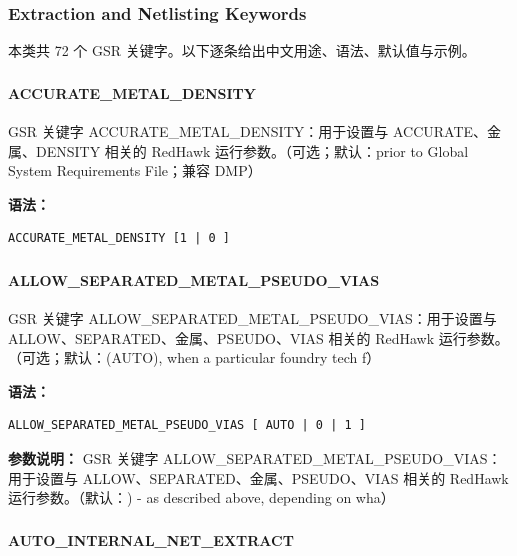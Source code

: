 \subsubsection*{Extraction and Netlisting Keywords}

本类共 72 个 GSR 关键字。以下逐条给出中文用途、语法、默认值与示例。

\subsubsection{}
\paragraph*{ACCURATE_METAL_DENSITY}

GSR 关键字 ACCURATE_METAL_DENSITY：用于设置与 ACCURATE、金属、DENSITY 相关的 RedHawk 运行参数。（可选；默认：prior to Global System Requirements File；兼容 DMP）

\textbf{语法：}
\begin{lstlisting}
ACCURATE_METAL_DENSITY [1 | 0 ]
\end{lstlisting}

\subsubsection{}
\paragraph*{ALLOW_SEPARATED_METAL_PSEUDO_VIAS}

GSR 关键字 ALLOW_SEPARATED_METAL_PSEUDO_VIAS：用于设置与 ALLOW、SEPARATED、金属、PSEUDO、VIAS 相关的 RedHawk 运行参数。（可选；默认：(AUTO), when a particular foundry tech f）

\textbf{语法：}
\begin{lstlisting}
ALLOW_SEPARATED_METAL_PSEUDO_VIAS [ AUTO | 0 | 1 ]
\end{lstlisting}

\textbf{参数说明：}
GSR 关键字 ALLOW\_SEPARATED\_METAL\_PSEUDO\_VIAS：用于设置与 ALLOW、SEPARATED、金属、PSEUDO、VIAS 相关的 RedHawk 运行参数。（默认：) - as described above, depending on wha）

\subsubsection{}
\paragraph*{AUTO_INTERNAL_NET_EXTRACT}

